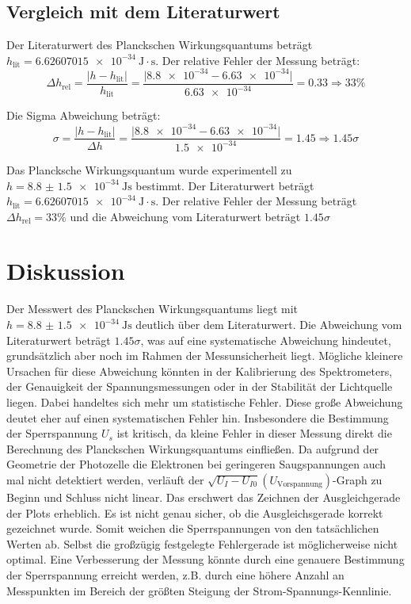 \documentclass[12pt,a4paper,titlepage]{scrartcl}
\numberwithin{equation}{section}
\numberwithin{table}{section}
\numberwithin{figure}{section}
\begin{document}
\subsection{Vergleich mit dem Literaturwert}
Der Literaturwert des Planckschen Wirkungsquantums beträgt $h_\text{lit} = \qty{6.62607015e-34}{\text{J}}\cdot\text{s}$. Der relative Fehler der Messung beträgt:
\begin{equation}
    \Delta h_\text{rel} = \frac{\lvert h - h_\text{lit} \rvert}{h_\text{lit}} = \frac{\lvert \num{8.8e-34} - \num{6.63e-34} \rvert}{\num{6.63e-34}} = 0.33 \Rightarrow 33\%
\end{equation}

Die Sigma Abweichung beträgt:
\begin{equation}
    \sigma = \frac{\lvert h - h_\text{lit} \rvert}{\Delta h} = \frac{\lvert \num{8.8e-34} - \num{6.63e-34} \rvert}{\num{1.5e-34}} = 1.45 \Rightarrow 1.45\sigma
\end{equation}

\begin{resultbox}[Ergebnis]
    Das Plancksche Wirkungsquantum wurde experimentell zu $h = \qty{8.8(15)e-34}{\joule\second}$ bestimmt. Der Literaturwert beträgt $h_\text{lit} = \qty{6.62607015e-34}{\text{J}}\cdot\text{s}$. Der relative Fehler der Messung beträgt $\Delta h_\text{rel} = 33\%$ und die Abweichung vom Literaturwert beträgt $1.45\sigma$
\end{resultbox}


\section{Diskussion}
Der Messwert des Planckschen Wirkungsquantums liegt mit $h = \qty{8.8(15)e-34}{\joule\second}$ deutlich über dem Literaturwert. Die Abweichung vom Literaturwert beträgt $1.45\sigma$, was auf eine systematische Abweichung hindeutet, grundsätzlich aber noch im Rahmen der Messunsicherheit liegt. Mögliche kleinere Ursachen für diese Abweichung könnten in der Kalibrierung des Spektrometers, der Genauigkeit der Spannungsmessungen oder in der Stabilität der Lichtquelle liegen. Dabei handeltes sich  mehr um statistische Fehler. Diese große Abweichung deutet eher auf einen systematischen Fehler hin. Insbesondere die Bestimmung der Sperrspannung $U_s$ ist kritisch, da kleine Fehler in dieser Messung direkt die Berechnung des Planckschen Wirkungsquantums einfließen. Da aufgrund der Geometrie der Photozelle die Elektronen bei geringeren Saugspannungen auch mal nicht detektiert werden, verläuft der $\sqrt{U_I-U_{I0}}(U_\text{Vorspannung})$-Graph zu Beginn und Schluss nicht linear. Das erschwert das Zeichnen der Ausgleichgerade der Plots erheblich.  Es ist nicht genau sicher, ob die Ausgleichsgerade korrekt gezeichnet wurde. Somit weichen die Sperrspannungen von den tatsächlichen Werten ab. Selbst die großzügig festgelegte Fehlergerade ist möglicherweise nicht optimal. Eine Verbesserung der Messung könnte durch eine genauere Bestimmung der Sperrspannung erreicht werden, z.B. durch eine höhere Anzahl an Messpunkten im Bereich der größten Steigung der Strom-Spannungs-Kennlinie.
\end{document}
